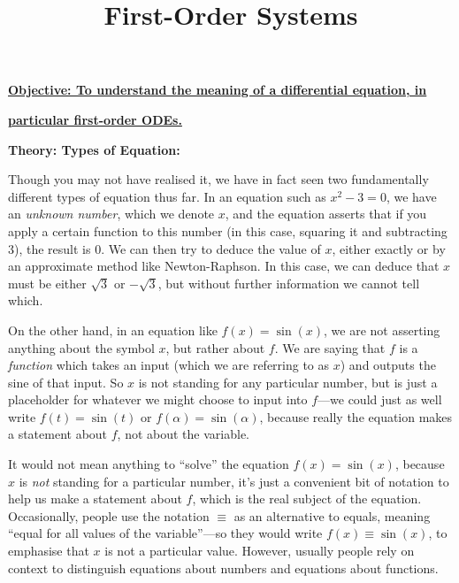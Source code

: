 \documentclass{article}
\begin{document}
\title{First-Order Systems}
\date{}

\maketitle
\thispagestyle{empty}

\Large

\vskip -10mm

\textbf{\underline{Objective: To understand the meaning of a differential equation, in}}

\textbf{\underline{particular first-order ODEs.}}



\vspace{5mm}



\textbf{Theory: Types of Equation:}

\bigskip



Though you may not have realised it, we have in fact seen two fundamentally different types of equation thus far. In an equation such as $x^2-3=0$, we have an \textit{unknown number}, which we denote $x$, and the equation asserts that if you apply a certain function to this number (in this case, squaring it and subtracting 3), the result is 0. We can then try to deduce the value of $x$, either exactly or by an approximate method like Newton-Raphson. In this case, we can deduce that $x$ must be either $\sqrt{3}$ or $-\sqrt{3}$, but without further information we cannot tell which.

On the other hand, in an equation like $f(x)=\sin(x)$, we are not asserting anything about the symbol $x$, but rather about $f$. We are saying that $f$ is a \textit{function} which takes an input (which we are referring to as $x$) and outputs the sine of that input. So $x$ is not standing for any particular number, but is just a placeholder for whatever we might choose to input into $f$---we could just as well write $f(t)=\sin(t)$ or $f(\alpha)=\sin(\alpha)$, because really the equation makes a statement about $f$, not about the variable.

It would not mean anything to ``solve'' the equation $f(x)=\sin(x)$, because $x$ is \textit{not} standing for a particular number, it's just a convenient bit of notation to help us make a statement about $f$, which is the real subject of the equation. Occasionally, people use the notation $\equiv$ as an alternative to equals, meaning ``equal for all values of the variable''---so they would write $f(x)\equiv \sin(x)$, to emphasise that $x$ is not a particular value. However, usually people rely on context to distinguish equations about numbers and equations about functions.
\end{document}
